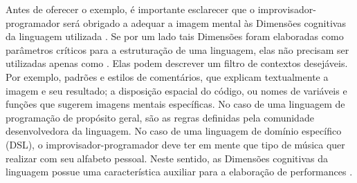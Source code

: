 Antes de oferecer o exemplo, é importante esclarecer que o improvisador-programador será obrigado a adequar a imagem mental às Dimensões cognitivas da linguagem utilizada . Se por um lado tais Dimensões foram elaboradas como parâmetros críticos para a estruturação de uma linguagem, elas não precisam ser utilizadas apenas como . Elas podem descrever um filtro de contextos desejáveis. Por exemplo, padrões e estilos de comentários, que explicam textualmente a imagem e seu resultado; a disposição espacial do código, ou  nomes de variáveis e funções que sugerem imagens mentais específicas. No caso de uma linguagem de programação de propósito geral, são as regras definidas pela comunidade desenvolvedora da linguagem. No caso de uma linguagem de domínio específico (DSL), o improvisador-programador deve ter em mente que tipo de música quer realizar com seu alfabeto pessoal. Neste sentido, as Dimensões cognitivas da linguagem possue uma característica auxiliar para a elaboração de performances .

